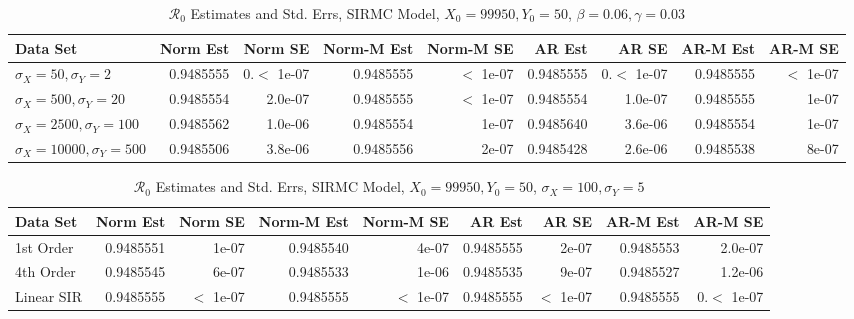 \message{ !name(draft_v13.tex)}\documentclass[12pt]{article}
\newcommand{\rr}{\ensuremath{\mathcal{R}_0}}
\begin{document}
\begin{table}[H]
	
	\caption{\label{tab:}$\rr$ Estimates and Std. Errs, SIRMC Model,
		$X_0 = 99950, Y_0 = 50$, $\beta = 0.06, \gamma = 0.03$}
	\centering
	\begin{footnotesize}
		\begin{tabular}[t]{l|r|r|r|r|r|r|r|r}
			\hline
			Data Set & Norm Est & Norm SE & Norm-M Est & Norm-M SE & AR Est & AR SE & AR-M Est & AR-M SE\\
			\hline
			$\sigma_X = 50, \sigma_Y = 2$ & 0.9485555 & 0.$<$ 1e-07 & 0.9485555 & $<$ 1e-07 & 0.9485555 & 0.$<$ 1e-07 & 0.9485555 & $<$ 1e-07\\
			\hline
			$\sigma_X = 500, \sigma_Y = 20$ & 0.9485554 & 2.0e-07 & 0.9485555 & $<$ 1e-07 & 0.9485554 & 1.0e-07 & 0.9485555 & 1e-07\\
			\hline
			$\sigma_X = 2500, \sigma_Y = 100$ & 0.9485562 & 1.0e-06 & 0.9485554 & 1e-07 & 0.9485640 & 3.6e-06 & 0.9485554 & 1e-07\\
			\hline
			$\sigma_X = 10000, \sigma_Y = 500$ & 0.9485506 & 3.8e-06 & 0.9485556 & 2e-07 & 0.9485428 & 2.6e-06 & 0.9485538 & 8e-07\\
			\hline
		\end{tabular}
	\end{footnotesize}
\end{table}

\begin{table}[H]
	
	\caption{\label{tab:}$\rr$ Estimates and Std. Errs, SIRMC Model,
		$X_0 = 99950, Y_0 = 50$, $\sigma_X = 100, \sigma_Y = 5$}
	\centering
	\begin{footnotesize}
		\begin{tabular}[t]{l|r|r|r|r|r|r|r|r}
			\hline
			Data Set & Norm Est & Norm SE & Norm-M Est & Norm-M SE & AR Est & AR SE & AR-M Est & AR-M SE\\
			\hline
			1st Order & 0.9485551 & 1e-07 & 0.9485540 & 4e-07 & 0.9485555 & 2e-07 & 0.9485553 & 2.0e-07\\
			\hline
			4th Order & 0.9485545 & 6e-07 & 0.9485533 & 1e-06 & 0.9485535 & 9e-07 & 0.9485527 & 1.2e-06\\
			\hline
			Linear SIR & 0.9485555 & $<$ 1e-07 & 0.9485555 & $<$ 1e-07 & 0.9485555 & $<$ 1e-07 & 0.9485555 & 0.$<$ 1e-07\\
			\hline
		\end{tabular}
	\end{footnotesize}
\end{table}
\end{document}

